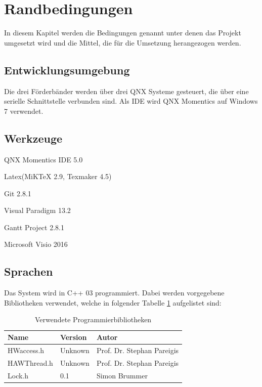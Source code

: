 \documentclass[a4paper, 11pt]{article}
\begin{document}
\section{Randbedingungen}
In diesem Kapitel werden die Bedingungen genannt unter denen das Projekt umgesetzt wird und die Mittel, die für die Umsetzung herangezogen werden.

\subsection{Entwicklungsumgebung}
Die drei Förderbänder werden über drei QNX Systeme gesteuert, die über eine serielle Schnittstelle verbunden sind. Als IDE wird QNX Momentics auf Windows 7 verwendet.

\subsection{Werkzeuge}
\begin{compactenum}[-]
\item QNX Momentics IDE 5.0
\item Latex(MiKTeX 2.9, Texmaker 4.5)
\item Git 2.8.1
\item Visual Paradigm 13.2
\item Gantt Project 2.8.1
\item Microsoft Visio 2016
\end{compactenum}

\subsection{Sprachen}
Das System wird in C++ 03 programmiert. Dabei werden vorgegebene Bibliotheken verwendet, welche in folgender Tabelle \ref{bibl} aufgelistet sind:
\medskip
\begin{table}[h]
\center
\begin{tabular}{|l|l|l|}
\hline
\textbf{Name}&\textbf{Version}&\textbf{Autor}\\
\hline
HWaccess.h&Unknown&Prof. Dr. Stephan Pareigis\\
\hline
HAWThread.h&Unknown&Prof. Dr. Stephan Pareigis \\
\hline
Lock.h&0.1&Simon Brummer \\
\hline
\end{tabular}
\caption{Verwendete Programmierbibliotheken}
\label{bibl}
\end{table}

\newpage
\end{document}
